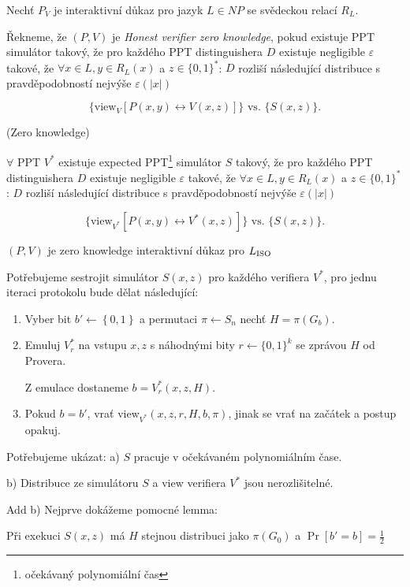 \documentclass[a4paper,12pt,titlepage]{article}
\def\definice{\medskip\noindent {\bf Definice: }}
\def\tvrzeni{\medskip\noindent {\bf Tvrzení: }}
\def\lemma{\noindent {\bf Lemma: }}
\def\dukaz{\noindent {\bf Důkaz: }}
\begin{document}
Nechť $P_V$ je interaktivní důkaz pro jazyk $L\in NP$ se svědeckou relací $R_L$.

Řekneme, že $(P,V)$ je \emph{Honest verifier zero knowledge}, pokud existuje
PPT simulátor takový, že pro každého PPT distinguishera $D$ existuje negligible
$\varepsilon$ takové, že $\forall x\in L,y\in R_L(x)$ a $z\in\{0,1\}^*$: $D$
rozliší následující distribuce s pravděpodobností nejvýše $\varepsilon(|x|)$

$$\{\text{view}_V[P(x,y)\leftrightarrow V(x,z)]\} \text{ vs. }\{S(x,z)\}.$$

\definice (Zero knowledge)

$\forall$ PPT $ V^*$ existuje expected PPT\footnote{očekávaný polynomiální čas}
simulátor $S$ takový, že pro každého PPT distinguishera $D$ existuje negligible
$\varepsilon$ takové, že $\forall x\in L,y\in R_L(x)$ a $z\in\{0,1\}^*$: $D$
rozliší následující distribuce s pravděpodobností nejvýše $\varepsilon(|x|)$


$$\{\text{view}_{V^*}[P(x,y)\leftrightarrow V^*(x,z)]\} \text{ vs. }\{S(x,z)\}.$$


\tvrzeni $(P,V)$ je zero knowledge interaktivní důkaz pro $L_{\rm ISO}$

\dukaz Potřebujeme sestrojit simulátor $S(x,z)$ pro každého verifiera $V^*$, pro jednu iteraci protokolu bude dělat následující:

\begin{enumerate}

	\item Vyber bit $b'\leftarrow \left\{ 0,1 \right\}$ a permutaci $\pi \leftarrow S_n$ nechť  $H=\pi(G_b)$.

	\item Emuluj $V_r^*$ na vstupu $x,z$ s náhodnými bity $r\leftarrow\{0,1\}^k$ se zprávou $H$ od Provera.

		Z emulace dostaneme $b=V^*_r(x, z,H)$.

	\item Pokud $b=b'$, vrať view$_{V^*}(x,z,r,H,b,\pi)$, jinak se vrať na začátek a postup opakuj.

\end{enumerate}

Potřebujeme ukázat:
a) $S$ pracuje v očekávaném polynomiálním čase.

b) Distribuce ze simulátoru $S$ a view verifiera $V^*$ jsou nerozlišitelné. 


Add b)
Nejprve dokážeme pomocné lemma:

\lemma Při exekuci $S(x,z)$ má $H$ stejnou distribuci jako $\pi(G_0)$ a $\Pr[b'=b]=\frac{1}{2}$
\end{document}
